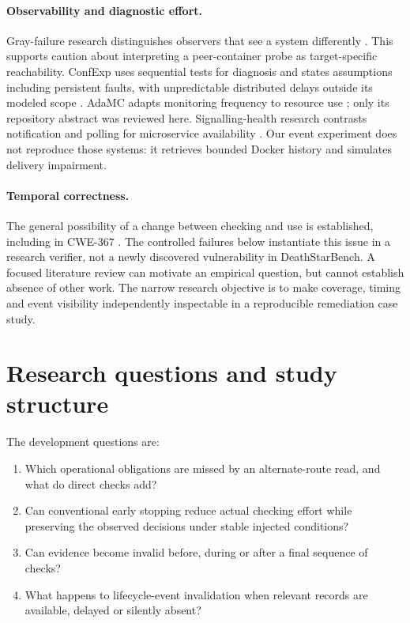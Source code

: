 \documentclass[11pt]{article}
\begin{document}
\paragraph{Observability and diagnostic effort.}
Gray-failure research distinguishes observers that see a system differently \cite{gray}. This supports caution about interpreting a peer-container probe as target-specific reachability. ConfExp uses sequential tests for diagnosis and states assumptions including persistent faults, with unpredictable distributed delays outside its modeled scope \cite{confexp}. AdaMC adapts monitoring frequency to resource use \cite{adamc}; only its repository abstract was reviewed here. Signalling-health research contrasts notification and polling for microservice availability \cite{signalling}. Our event experiment does not reproduce those systems: it retrieves bounded Docker history and simulates delivery impairment.

\paragraph{Temporal correctness.}
The general possibility of a change between checking and use is established, including in CWE-367 \cite{cwe}. The controlled failures below instantiate this issue in a research verifier, not a newly discovered vulnerability in DeathStarBench. A focused literature review can motivate an empirical question, but cannot establish absence of other work. The narrow research objective is to make coverage, timing and event visibility independently inspectable in a reproducible remediation case study.

\section{Research questions and study structure}
The development questions are:
\begin{enumerate}
\item Which operational obligations are missed by an alternate-route read, and what do direct checks add?
\item Can conventional early stopping reduce actual checking effort while preserving the observed decisions under stable injected conditions?
\item Can evidence become invalid before, during or after a final sequence of checks?
\item What happens to lifecycle-event invalidation when relevant records are available, delayed or silently absent?
\end{enumerate}
\end{document}

